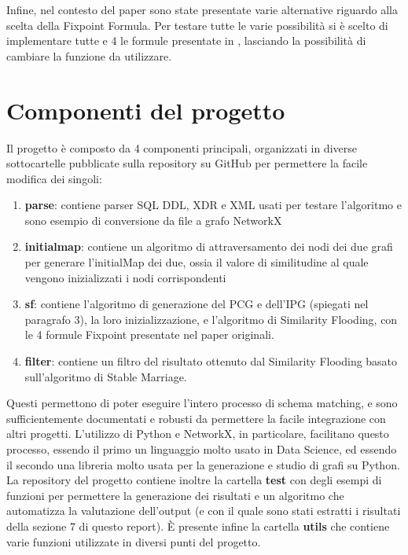 \documentclass{article}
\begin{document}
Infine, nel contesto del paper sono state presentate varie alternative riguardo alla scelta della Fixpoint Formula. Per testare tutte le varie possibilità si è scelto di implementare tutte e 4 le formule presentate in \citep{sfpaper_ext}, lasciando la possibilità di cambiare la funzione da utilizzare.



\section{Componenti del progetto}

Il progetto è composto da 4 componenti principali, organizzati in diverse sottocartelle pubblicate sulla repository su GitHub per permettere la facile modifica dei singoli:
\begin{enumerate}
	\item \textbf{parse}: contiene parser SQL DDL, XDR e XML usati per testare l'algoritmo e sono esempio di conversione da file a grafo NetworkX
	\item \textbf{initialmap}: contiene un algoritmo di attraversamento dei nodi dei due grafi per generare l'initialMap dei due, ossia il valore di similitudine al quale vengono inizializzati i nodi corrispondenti
	\item \textbf{sf}: contiene l'algoritmo di generazione del PCG e dell'IPG (spiegati nel paragrafo 3), la loro inizializzazione, e l'algoritmo di Similarity Flooding, con le 4 formule Fixpoint presentate nel paper originali. 
	\item \textbf{filter}: contiene un filtro del risultato ottenuto dal Similarity Flooding basato sull'algoritmo di Stable Marriage.
\end{enumerate}
Questi permettono di poter eseguire l'intero processo di schema matching, e sono sufficientemente documentati e robusti da permettere la facile integrazione con altri progetti. L'utilizzo di Python e NetworkX, in particolare, facilitano questo processo, essendo il primo un linguaggio molto usato in Data Science, ed essendo il secondo una libreria molto usata per la generazione e studio di grafi su Python.\\

La repository del progetto contiene inoltre la cartella \textbf{test} con degli esempi di funzioni per permettere la generazione dei risultati e un algoritmo che automatizza la valutazione dell'output (e con il quale sono stati estratti i risultati della sezione 7 di questo report). È presente infine la cartella \textbf{utils} che contiene varie funzioni utilizzate in diversi punti del progetto.
\end{document}

